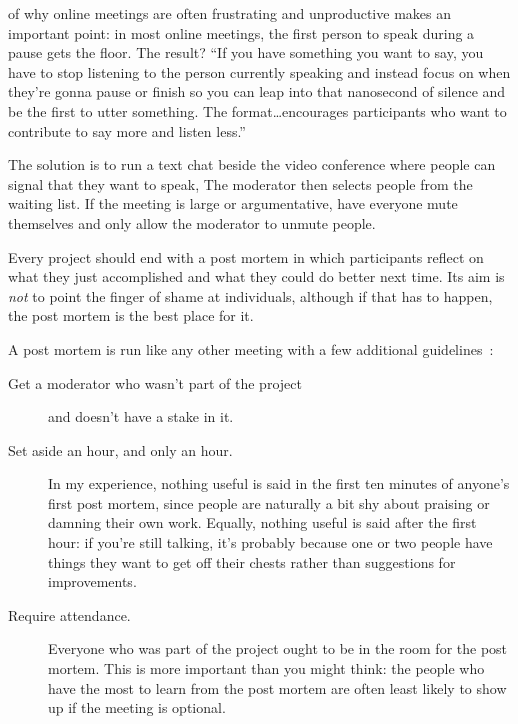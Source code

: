 \begin{descripción}
\begin{enumerate}
\end{enumerate}


of why online meetings are often frustrating and unproductive
makes an important point:
in most online meetings,
the first person to speak during a pause gets the floor.
The result?
``If you have something you want to say,
you have to stop listening to the person currently speaking
and instead focus on when they're gonna pause or finish
so you can leap into that nanosecond of silence and be the first to utter something.
The format{\ldots}encourages participants who want to contribute to say more and listen less.''

The solution is to run a text chat beside the video conference
where people can signal that they want to speak,
The moderator then selects people from the waiting list.
If the meeting is large or argumentative,
have everyone mute themselves
and only allow the moderator to unmute people.


Every project should end with a post mortem
in which participants reflect on what they just accomplished
and what they could do better next time.
Its aim is \emph{not} to point the finger of shame at individuals,
although if that has to happen,
the post mortem is the best place for it.

A post mortem is run like any other meeting
with a few additional guidelines~\cite{Derb2006}:

\begin{description}

\item[Get a moderator who wasn't part of the project]
  and doesn't have a stake in it.

\item[Set aside an hour, and only an hour.]
  In my experience,
  nothing useful is said in the first ten minutes of anyone's first post mortem,
  since people are naturally a bit shy about praising or damning their own work.
  Equally,
  nothing useful is said after the first hour:
  if you're still talking,
  it's probably because one or two people
  have things they want to get off their chests
  rather than suggestions for improvements.

\item[Require attendance.]
  Everyone who was part of the project ought to be in the room for the post mortem.
  This is more important than you might think:
  the people who have the most to learn from the post mortem
  are often least likely to show up if the meeting is optional.


\end{description}
\end{descripción}
